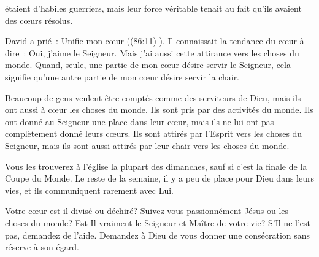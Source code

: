 


 étaient d'habiles guerriers, mais leur force véritable
 tenait au fait qu'ils avaient des c\oe{}urs résolus. 

David a prié~:
 \og Unifie mon c\oe{}ur \fg{} ((86:11) \NBS).
 Il connaissait la tendance du c\oe{}ur à dire~:
 \og Oui, j'aime le Seigneur. Mais j'ai aussi cette attirance
 vers les choses du monde. \fg{}
 Quand, seule, une partie de mon c\oe{}ur désire servir le Seigneur,
 cela signifie qu'une autre partie de mon c\oe{}ur désire servir la chair. 


Beaucoup de gens veulent être comptés comme des serviteurs de Dieu,
 mais ils ont aussi à c\oe{}ur les choses du monde.
 Ils sont pris par des activités du monde.
 Ils ont donné au Seigneur une place dans leur c\oe{}ur,
 mais ils ne lui ont pas complètement donné leurs c\oe{}urs.
 Ils sont attirés par l'Esprit vers les choses du Seigneur,
 mais ils sont aussi attirés par leur chair vers les choses du monde. 

Vous les trouverez à l'église la plupart des dimanches,
 sauf si c'est la finale de la Coupe du Monde. Le reste de la semaine,
 il y a peu de place pour Dieu dans leurs vies,
 et ils communiquent rarement avec Lui. 

Votre c\oe{}ur est-il divisé ou déchiré?
 Suivez-vous passionnément Jésus ou les choses du monde?
 Est-Il vraiment le Seigneur et Maître de votre vie?
 S'Il ne l'est pas, demandez de l'aide. Demandez à Dieu de vous donner
 une consécration sans réserve à son égard. 

\dvrule






